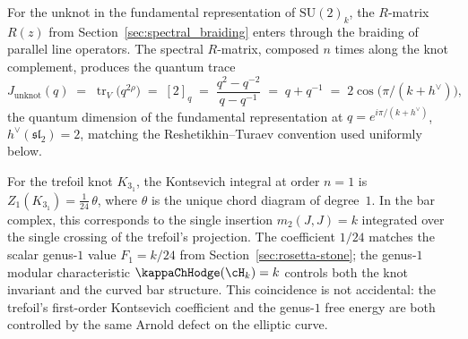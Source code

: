 For the unknot in the fundamental representation of $\mathrm{SU}(2)_k$,
the $R$-matrix $R(z)$ from Section~\ref{sec:spectral_braiding}
enters through the braiding of parallel line operators. The
spectral $R$-matrix, composed $n$ times along the knot complement,
produces the quantum trace
\[
J_{\text{unknot}}(q) \;=\; \operatorname{tr}_V\bigl(q^{2\rho}\bigr)
\;=\; [2]_q \;=\; \frac{q^{2}-q^{-2}}{q-q^{-1}} \;=\; q + q^{-1}
\;=\; 2\cos\!\bigl(\pi/(k+h^\vee)\bigr),
\]
the quantum dimension of the fundamental representation at
$q = e^{i\pi/(k+h^\vee)}$, $h^\vee(\mathfrak{sl}_2)=2$, matching
the Reshetikhin--Turaev convention used uniformly below.

\begin{remark}
\label{rem:trefoil}
For the trefoil knot $K_{3_1}$, the Kontsevich integral at order
$n = 1$ is
$Z_1(K_{3_1}) = \frac{1}{24}\,\theta$,
where $\theta$ is the unique chord diagram of degree~$1$.
In the bar complex, this corresponds to the single insertion
$m_2(J, J) = k$ integrated over the single crossing of the
trefoil's projection. The coefficient $1/24$ matches the scalar
genus-$1$ value $F_1=k/24$ from
Section~\ref{sec:rosetta-stone}; the genus-$1$ modular
characteristic $\kappaChHodge(\cH_k) = k$ controls both the knot
invariant and the curved bar structure. This coincidence is not
accidental: the trefoil's first-order Kontsevich coefficient and
the genus-$1$ free energy are both controlled by the same
Arnold defect on the elliptic curve.
\end{remark}

